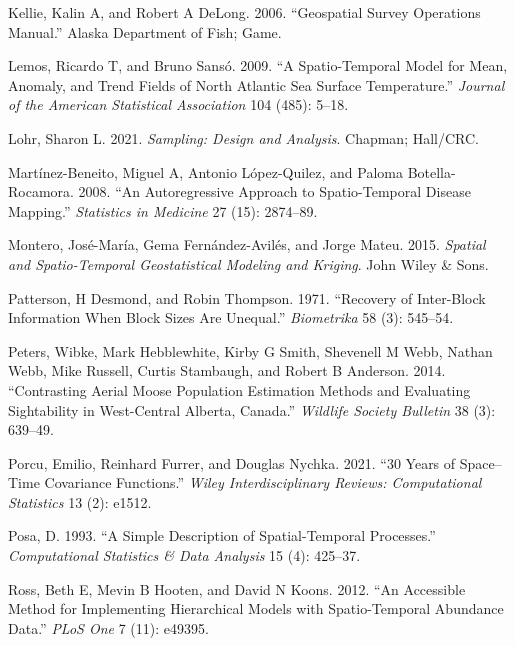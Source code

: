 \documentclass[smallextended]{svjour3}       %
\newlength{\cslhangindent}
\newlength{\cslentryspacingunit} %
\newenvironment{CSLReferences}[2] %
 {%
  \setlength{\parindent}{0pt}
  \ifodd #1
  \let\oldpar\par
  \def\par{\hangindent=\cslhangindent\oldpar}
  \fi
  \setlength{\parskip}{#2\cslentryspacingunit}
 }%
 {}
\begin{document}
\begin{CSLReferences}{1}{0}
\leavevmode{}%
Kellie, Kalin A, and Robert A DeLong. 2006. {``Geospatial Survey
Operations Manual.''} Alaska Department of Fish; Game.

\leavevmode{}%
Lemos, Ricardo T, and Bruno Sansó. 2009. {``A Spatio-Temporal Model for
Mean, Anomaly, and Trend Fields of North Atlantic Sea Surface
Temperature.''} \emph{Journal of the American Statistical Association}
104 (485): 5--18.

\leavevmode{}%
Lohr, Sharon L. 2021. \emph{Sampling: Design and Analysis}. Chapman;
Hall/CRC.

\leavevmode{}%
Martínez-Beneito, Miguel A, Antonio López-Quilez, and Paloma
Botella-Rocamora. 2008. {``An Autoregressive Approach to Spatio-Temporal
Disease Mapping.''} \emph{Statistics in Medicine} 27 (15): 2874--89.

\leavevmode{}%
Montero, José-María, Gema Fernández-Avilés, and Jorge Mateu. 2015.
\emph{Spatial and Spatio-Temporal Geostatistical Modeling and Kriging}.
John Wiley \& Sons.

\leavevmode{}%
Patterson, H Desmond, and Robin Thompson. 1971. {``Recovery of
Inter-Block Information When Block Sizes Are Unequal.''}
\emph{Biometrika} 58 (3): 545--54.

\leavevmode{}%
Peters, Wibke, Mark Hebblewhite, Kirby G Smith, Shevenell M Webb, Nathan
Webb, Mike Russell, Curtis Stambaugh, and Robert B Anderson. 2014.
{``Contrasting Aerial Moose Population Estimation Methods and Evaluating
Sightability in West-Central Alberta, Canada.''} \emph{Wildlife Society
Bulletin} 38 (3): 639--49.

\leavevmode{}%
Porcu, Emilio, Reinhard Furrer, and Douglas Nychka. 2021. {``30 Years of
Space--Time Covariance Functions.''} \emph{Wiley Interdisciplinary
Reviews: Computational Statistics} 13 (2): e1512.

\leavevmode{}%
Posa, D. 1993. {``A Simple Description of Spatial-Temporal Processes.''}
\emph{Computational Statistics \& Data Analysis} 15 (4): 425--37.

\leavevmode{}%
Ross, Beth E, Mevin B Hooten, and David N Koons. 2012. {``An Accessible
Method for Implementing Hierarchical Models with Spatio-Temporal
Abundance Data.''} \emph{PLoS One} 7 (11): e49395.


\end{CSLReferences}
\end{document}

